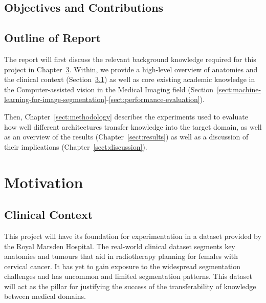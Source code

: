 \documentclass[12pt,twoside]{report}
\begin{document}

\section{Objectives and Contributions}

\section{Outline of Report}

The report will first discuss the relevant background knowledge required for this project in Chapter~\ref{sect:motivation}. Within, we provide a high-level overview of anatomies and the clinical context (Section~\ref{sect:clinical-context}) as well as core existing academic knowledge in the Computer-assisted vision in the Medical Imaging field (Section~\ref{sect:machine-learning-for-image-segmentation}-\ref{sect:performance-evaluation}). 

Then, Chapter~\ref{sect:methodology} describes the experiments used to evaluate how well different architectures transfer knowledge into the target domain, as well as an overview of the results (Chapter~\ref{sect:results}) as well as a discussion of their implications (Chapter~\ref{sect:discussion}).

\chapter{Motivation}\label{sect:motivation}

\section{Clinical Context}\label{sect:clinical-context}

This project will have its foundation for experimentation in a dataset provided by the Royal Marsden Hospital. The real-world clinical dataset segments key anatomies and tumours that aid in radiotherapy planning for females with cervical cancer. It has yet to gain exposure to the widespread segmentation challenges and has uncommon and limited segmentation patterns. This dataset will act as the pillar for justifying the success of the transferability of knowledge between medical domains.
\end{document}

